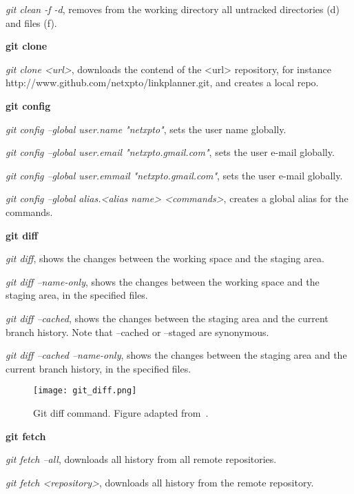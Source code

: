 \begin{refsection}
\noindent \emph{git clean -f -d}, removes from the working directory all untracked directories (d) and files (f).

\vspace*{5mm} \noindent \textbf{git clone}

\noindent \emph{git clone <url>}, downloads the contend of the <url> repository, for instance http://www.github.com/netxpto/linkplanner.git, and creates a local repo.

\vspace*{5mm} \noindent \textbf{git config}

\noindent \emph{git config --global user.name "netxpto"}, sets the user name globally.

\noindent \emph{git config --global user.email "netxpto.gmail.com"}, sets the user e-mail globally.

\noindent \emph{git config --global user.emmail "netxpto.gmail.com"}, sets the user e-mail globally.

\noindent \emph{git config --global alias.<alias name> <commands>}, creates a global alias for the commands.

\vspace*{5mm} \noindent \textbf{git diff}

\noindent \emph{git diff}, shows the changes between the working space and the staging area.

\noindent \emph{git diff --name-only}, shows the changes between the working space and the staging area, in the specified files.

\noindent \emph{git diff --cached}, shows the changes between the staging area and the current branch history. Note that --cached or --staged are synonymous.

\noindent \emph{git diff --cached --name-only}, shows the changes between the staging area and the current branch history, in the specified files.

\begin{figure}[H]
  \centering
  \texttt{[image: git\_diff.png]}
  \caption{Git diff command. Figure adapted from~\cite{Lodato19}.}\label{git_diff_command}
\end{figure}

\vspace*{5mm} \noindent \textbf{git fetch}

\noindent\emph{git fetch --all}, downloads all history from all remote repositories.

\noindent\emph{git fetch <repository>}, downloads all history from the remote repository.


\end{refsection}
